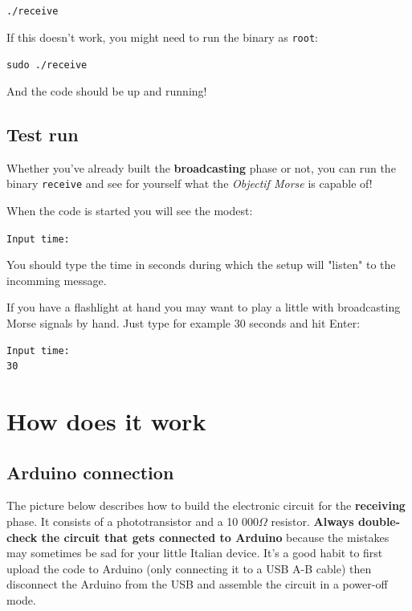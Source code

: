 \documentclass[10pt]{report}
\begin{document}
\begin{snugshade}
\verb|./receive|
\end{snugshade}

If this doesn't work, you might need to run the binary as \verb|root|:

\begin{snugshade}
\verb|sudo ./receive|
\end{snugshade}

And the code should be up and running!

\subsection{Test run}

Whether you've already built the \textbf{broadcasting} phase or not, you can run the binary \verb|receive| and see for yourself what the \textit{Objectif Morse} is capable of!

When the code is started you will see the modest:

\begin{snugshade}
\verb|Input time:|
\end{snugshade}

You should type the time in seconds during which the setup will "listen" to the incomming message.

If you have a flashlight at hand you may want to play a little with broadcasting Morse signals by hand. Just type for example 30 seconds and hit Enter:

\begin{snugshade}
\begin{verbatim}
Input time:
30
\end{verbatim}
\end{snugshade}


\section{How does it work}

\subsection{Arduino connection}

The picture below describes how to build the electronic circuit for the \textbf{receiving} phase. It consists of a phototransistor and a 10 000$\Omega$ resistor. \textbf{Always double-check the circuit that gets connected to Arduino} because the mistakes may sometimes be sad for your little Italian device. It's a good habit to first upload the code to Arduino (only connecting it to a USB A-B cable) then disconnect the Arduino from the USB and assemble the circuit in a power-off mode.
\end{document}
